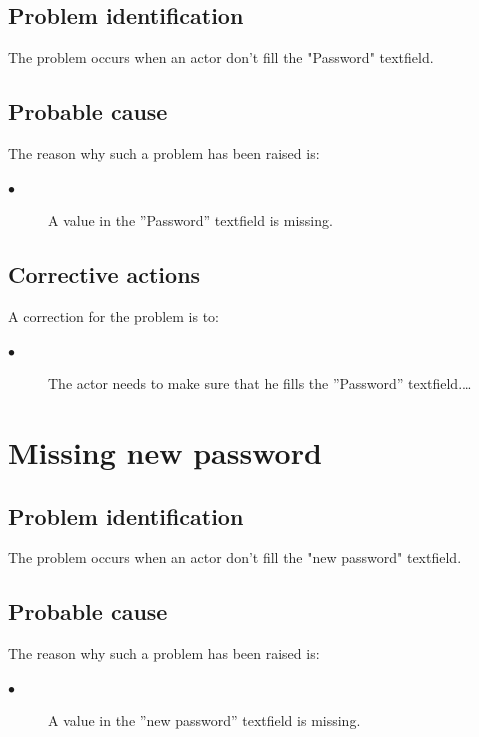 \subsection{Problem identification}
The problem occurs when an actor don't fill the "Password" textfield.

\subsection{Probable cause}

The reason why such a problem has been raised is:\\
\begin{description}
\item[$\bullet$] A value in the ''Password'' textfield is missing.
\end{description}


\subsection{Corrective actions}

A correction for the problem is to:\\
\begin{description}
\item[$\bullet$] The actor needs to make sure that he fills the
''Password'' textfield.\ldots

\end{description}



\section{Missing new password} 

\subsection{Problem identification}
The problem occurs when an actor don't fill the "new password" textfield.

\subsection{Probable cause}

The reason why such a problem has been raised is:\\
\begin{description}
\item[$\bullet$] A value in the ''new password'' textfield is missing.
\end{description}


